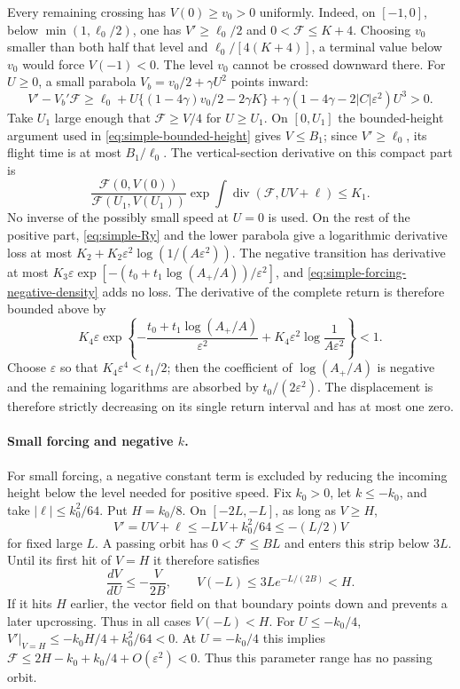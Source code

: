 Every remaining crossing has $V(0)\ge v_0>0$ uniformly.  Indeed, on
$[-1,0]$, below $\min(1,\ell_0/2)$, one has
$V'\ge\ell_0/2$ and $0<\mathcal F\le K+4$.
Choosing $v_0$ smaller than both half that level and
$\ell_0/[4(K+4)]$, a terminal value below $v_0$ would force
$V(-1)<0$.  The level $v_0$ cannot be crossed downward there.
For $U\ge0$, a small parabola $V_b=v_0/2+\gamma U^2$ points inward:
\[
 V'-V_b'\mathcal F\ge\ell_0+
 U\{(1-4\gamma)v_0/2-2\gamma K\}
 +\gamma(1-4\gamma-2|C|\varepsilon^2)U^3>0.
\]
Take $U_1$ large enough that $\mathcal F\ge V/4$ for $U\ge U_1$.
On $[0,U_1]$ the bounded-height argument used in
\eqref{eq:simple-bounded-height} gives $V\le B_1$; since
$V'\ge\ell_0$, its flight time is at most $B_1/\ell_0$.
The vertical-section derivative on this compact part is
\[
 \frac{\mathcal F(0,V(0))}{\mathcal F(U_1,V(U_1))}
     \exp\!\int\operatorname{div}(\mathcal F,UV+\ell)
 \le K_1.
\]
No inverse of the possibly small speed at $U=0$ is used.
On the rest of the positive part, \eqref{eq:simple-Ry} and the lower
parabola give a logarithmic derivative loss at most
$K_2+K_2\varepsilon^2\log(1/(A\varepsilon^2))$.
The negative transition has derivative at most
$K_3\varepsilon\exp[-(t_0+t_1\log(A_+/A))/\varepsilon^2]$,
and \eqref{eq:simple-forcing-negative-density} adds no loss.
The derivative of the complete return is therefore bounded above by
\begin{equation}\label{eq:simple-forcing-multiplier}
 K_4\varepsilon\exp\left\{
 -\frac{t_0+t_1\log(A_+/A)}{\varepsilon^2}
 +K_4\varepsilon^2\log\frac1{A\varepsilon^2}\right\}<1.
\end{equation}
Choose $\varepsilon$ so that $K_4\varepsilon^4<t_1/2$; then the
coefficient of $\log(A_+/A)$ is negative and the remaining logarithms
are absorbed by $t_0/(2\varepsilon^2)$. The displacement is therefore
strictly decreasing on its single return interval and has at most one zero.

\paragraph{Small forcing and negative $k$.}
For small forcing, a negative constant term is excluded by reducing
the incoming height below the level needed for positive speed.
Fix $k_0>0$, let $k\le-k_0$, and take $|\ell|\le k_0^2/64$.
Put $H=k_0/8$.  On $[-2L,-L]$, as long as $V\ge H$,
\[
 V'=UV+\ell\le-LV+k_0^2/64\le-(L/2)V
\]
for fixed large $L$.  A passing orbit has $0<\mathcal F\le B L$ and
enters this strip below $3L$.  Until its first hit of $V=H$ it therefore
satisfies
\[
 \frac{dV}{dU}\le-\frac{V}{2B},\qquad
 V(-L)\le3Le^{-L/(2B)}<H.
\]
If it hits $H$ earlier, the vector field on that boundary points down and
prevents a later upcrossing.  Thus in all cases $V(-L)<H$.  For
$U\le-k_0/4$,
$V'|_{V=H}\le-k_0H/4+k_0^2/64<0$.
At $U=-k_0/4$ this implies
$\mathcal F\le2H-k_0+k_0/4+O(\varepsilon^2)<0$.
Thus this parameter range has no passing orbit.

